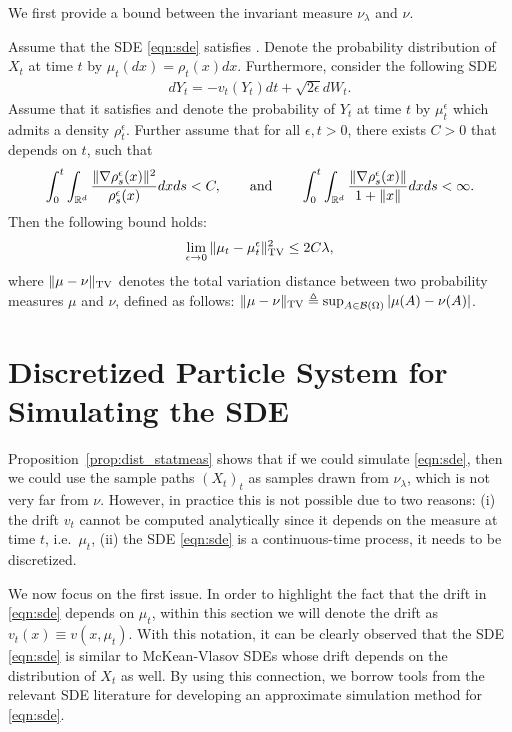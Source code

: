 We first provide a bound between the invariant measure $\nu_\lambda$ and $\nu$.

\begin{prop}
\label{prop:dist_statmeas}
Assume that the SDE \eqref{eqn:sde} satisfies . Denote the probability distribution of $X_t$ at time $t$ by $\mu_t(dx) = \rho_t (x) dx$. Furthermore, consider the following SDE
\begin{align}
d Y_t = - v_t(Y_t) dt + \sqrt{2 \epsilon } d W_t. \label{eqn:sde_eps}
\end{align}
Assume that it satisfies  and denote the probability of $Y_t$ at time $t$ by $\mu^\epsilon_t$ which admits a density $\rho^\epsilon_t$. Further assume that for all $\epsilon,t>0$, there exists $C >0$ that depends on $t$, such that
\begin{align}
\int_{0}^t \int_{\mathbb{R}^d} \frac{\|\nabla \rho^\epsilon_s(x) \|^2}{\rho^\epsilon_s(x)} dx ds <C, \qquad \text{and} \qquad \int_{0}^t \int_{\mathbb{R}^d}  \frac{\|\nabla \rho^\epsilon_s(x)\|}{1+\|x\|} dx ds <\infty.
\end{align}
Then the following bound holds:
\begin{align}
\lim_{\epsilon \rightarrow 0} \| \mu_t - \mu^\epsilon_t \|_{\textnormal{TV}}^2 \leq 2 C \lambda,
\end{align}
where $\|\mu-\nu\|_{\textnormal{TV}}$ denotes the total variation distance between two probability measures $\mu$ and $\nu$, defined as follows: $\|\mu-\nu\|_{\textnormal{TV}}\triangleq \sup_{A \in {\cal B}(\Omega)} |\mu(A) -\nu(A) |$.
\end{prop}

\section{Discretized Particle System for Simulating the SDE}

Proposition~\ref{prop:dist_statmeas} shows that if we could simulate \eqref{eqn:sde}, then we could use the sample paths $(X_t)_t$ as
samples drawn from $\nu_\lambda$, which is not very far from $\nu$. However, in practice this is not possible due to two reasons: (i) the drift $v_t$ cannot be computed analytically since it depends on the measure at time $t$, i.e.\ $\mu_t$, (ii) the SDE \eqref{eqn:sde} is a continuous-time process, it needs to be discretized.  

We now focus on the first issue. In order to highlight the fact that the drift in \eqref{eqn:sde} depends on $\mu_t$, within this section we will denote the drift as $v_t(x) \equiv v(x, \mu_t)$. With this notation, it can be clearly observed that the SDE \eqref{eqn:sde} is similar to McKean-Vlasov SDEs \cite{veretennikov2006ergodic,mishura2016existence} whose drift depends on the distribution of $X_t$ as well. By using this connection, we borrow tools from the relevant SDE literature \cite{malrieu03,cgm-08} for developing an approximate simulation method for \eqref{eqn:sde}. 

